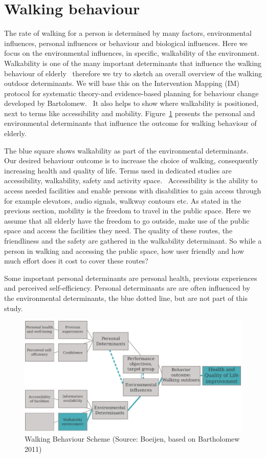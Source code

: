 \section{Walking behaviour}\label{walking}
The rate of walking for a person is determined by many factors, environmental influences, personal influences or behaviour and biological influences. Here we focus on the environmental influences, in specific, walkability of the environment. Walkability is one of the many important determinants that influence the walking behaviour of elderly~\cite{Vine2012} therefore we try to sketch an overall overview of the walking outdoor determinants. We will base this on the Intervention Mapping (IM) protocol for systematic theory-and evidence-based planning for behaviour change developed by Bartolomew.~\cite{Bartholmew2011} It also helps to show where walkability is positioned, next to terms like accessibility and mobility. Figure~\ref{behaviour} presents the personal and environmental determinants that influence the outcome for walking behaviour of elderly. 

The blue square shows walkability as part of the environmental determinants. Our desired behaviour outcome is to increase the choice of walking, consequently increasing health and quality of life. Terms used in dedicated studies are accessibility, walkability, safety and activity space.~\cite{Vine2012} Accessibility is the ability to access needed facilities and enable persons with disabilities to gain access through for example elevators, audio signals, walkway contours etc. As stated in the previous section, mobility is the freedom to travel in the public space. Here we assume that all elderly have the freedom to go outside, make use of the public space and access the facilities they need. The quality of these routes, the friendliness and the safety are gathered in the walkability determinant. So while a person in walking and accessing the public space, how user friendly and how much effort does it cost to cover these routes?

Some important personal determinants are personal health, previous experiences and perceived self-efficiency. Personal determinants are are often influenced by the environmental determinants, the blue dotted line, but are not part of this study.

\begin{figure}[h]
\includegraphics[width=\textwidth]{img/B_bartolomew.pdf}
\centering
\caption[Walking Behaviour Scheme]{Walking Behaviour Scheme (Source: Boeijen, based on Bartholomew 2011)
\label{behaviour}}
\end{figure}

